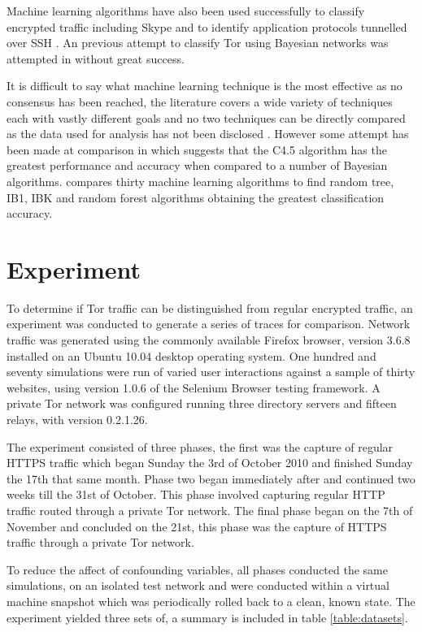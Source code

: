 \documentclass[conference]{IEEEtran}
\begin{document}
Machine learning algorithms have also been used successfully to classify
encrypted traffic including Skype \parencite{Alshammari:2009p7474} and to
identify application protocols tunnelled over SSH \parencite{Dusi:2008p6254}.
An previous attempt to classify Tor using Bayesian networks was attempted in
\textcite{Herrmann:2009p1189} without great success.

It is difficult to say what machine learning technique is the most effective as
no consensus has been reached, the literature covers a wide variety of
techniques each with vastly different goals and no two techniques can be
directly compared as the data used for analysis has not been disclosed
\parencite{Kim:2007p3867}. However some attempt has been made at comparison in
\textcite{Williams:2006p3849} which suggests that the C4.5 algorithm has the
greatest performance and accuracy when compared to a number of Bayesian
algorithms. \textcite{Mohd:2009p6484} compares thirty machine learning
algorithms to find random tree, IB1, IBK and random forest algorithms
obtaining the greatest classification accuracy.

\section{Experiment}

To determine if Tor traffic can be distinguished from regular encrypted
traffic, an experiment was conducted to generate a series of traces for
comparison. Network traffic was generated using the commonly available Firefox
browser, version 3.6.8 installed on an Ubuntu 10.04 desktop operating system.
One hundred and seventy simulations were run of varied user interactions
against a sample of thirty websites, using version 1.0.6 of the Selenium
Browser testing framework. A private Tor network was configured running three
directory servers and fifteen relays, with version 0.2.1.26.

The experiment consisted of three phases, the first was the capture of regular
HTTPS traffic which began Sunday the 3rd of October 2010 and finished Sunday
the 17th that same month. Phase two began immediately after and continued two
weeks till the 31st of October. This phase involved capturing regular HTTP
traffic routed through a private Tor network. The final phase began on the 7th
of November and concluded on the 21st, this phase was the capture of HTTPS
traffic through a private Tor network.

To reduce the affect of confounding variables, all phases conducted the same
simulations, on an isolated test network and were conducted within a virtual
machine snapshot which was periodically rolled back to a clean, known state.
The experiment yielded three sets of, a summary is included in table
\ref{table:datasets}.
\end{document}
